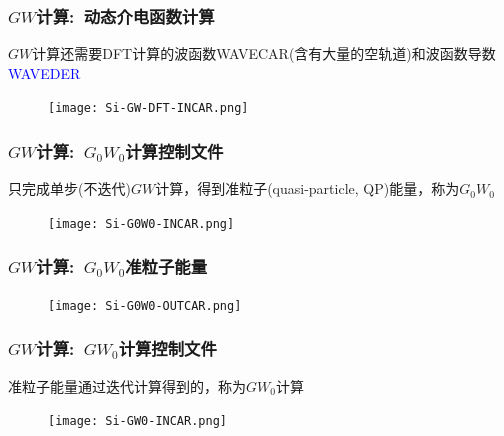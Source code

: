 \frame
{
	\frametitle{$GW$计算:~动态介电函数计算}
	$GW$计算还需要\textrm{DFT}计算的波函数\textrm{WAVECAR(含有大量的空轨道)}和波函数导数\textcolor{blue}{\textrm{WAVEDER}}
\vskip 5pt
{\fontsize{7.5pt}{5.2pt}\selectfont{计算与光学动态介电函数的计算类似}}%
\begin{figure}[h!]
	\vskip -2pt
\centering
\texttt{[image: Si-GW-DFT-INCAR.png]}
\caption{\fontsize{6.2pt}{5.2pt}}%
\label{Si-GW-DFT-INCAR}
\end{figure}
}

\frame
{
	\frametitle{$GW$计算:~$G_0W_0$计算控制文件}
	只完成单步(不迭代)$GW$计算，得到准粒子(\textrm{quasi-particle, QP})能量，称为$G_0W_0$%
\begin{figure}[h!]
	\vskip -5pt
\centering
\texttt{[image: Si-G0W0-INCAR.png]}
\caption{\fontsize{6.2pt}{5.2pt}}%
\label{Si-G0W0-INCAR}
\end{figure}
}

\frame
{
	\frametitle{$GW$计算:~$G_0W_0$准粒子能量}
	\vskip -10pt
\begin{figure}[h!]
\centering
\texttt{[image: Si-G0W0-OUTCAR.png]}
\caption{\fontsize{6.2pt}{5.2pt}}%
\label{Si-G0W0-OUTCAR}
\end{figure}
}

\frame
{
	\frametitle{$GW$计算:~$GW_0$计算控制文件}
准粒子能量通过迭代计算得到的，称为$GW_0$计算
\vskip 5pt
{\fontsize{7.5pt}{5.2pt}}%
\begin{figure}[h!]
	\vskip -5pt
\centering
\texttt{[image: Si-GW0-INCAR.png]}
\caption{\fontsize{6.2pt}{5.2pt}}%
\label{Si-GW0-INCAR}
\end{figure}
}

